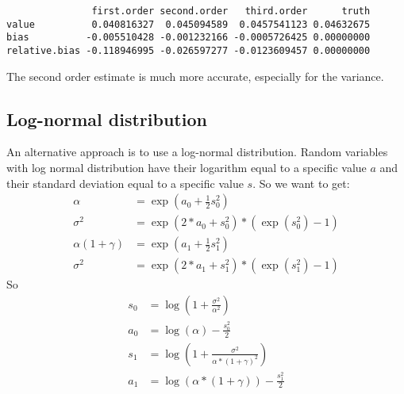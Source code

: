 \documentclass[12pt]{article}
\begin{document}
\begin{verbatim}
               first.order second.order   third.order      truth
value          0.040816327  0.045094589  0.0457541123 0.04632675
bias          -0.005510428 -0.001232166 -0.0005726425 0.00000000
relative.bias -0.118946995 -0.026597277 -0.0123609457 0.00000000
\end{verbatim}

The second order estimate is much more accurate, especially for the
variance.

\clearpage

\subsection{Log-normal distribution}
\label{sec:org3993d6c}

An alternative approach is to use a log-normal distribution. Random
variables with log normal distribution have their logarithm equal to a
specific value \(a\) and their standard deviation equal to a specific
value \(s\). So we want to get:
\begin{align*}
\alpha &= \exp(a_0 + \frac{1}{2} s_0^2) \\
\sigma^2 &= \exp(2*a_0 + s_0^2)*(\exp(s_0^2)-1) \\
\alpha (1+\gamma) &= \exp(a_1 + \frac{1}{2} s_1^2) \\
\sigma^2 &= \exp(2*a_1 + s_1^2)*(\exp(s_1^2)-1)
\end{align*}
So
\begin{align*}
s_0 &= \log\left(1+\frac{\sigma^2}{\alpha^2}\right)\\
a_0 &= \log(\alpha)-\frac{s_0^2}{2}\\
s_1 &= \log\left(1+\frac{\sigma^2}{\alpha*(1+\gamma)^2}\right)\\
a_1 &= \log(\alpha*(1+\gamma))-\frac{s_1^2}{2}
\end{align*}

\clearpage
\end{document}
